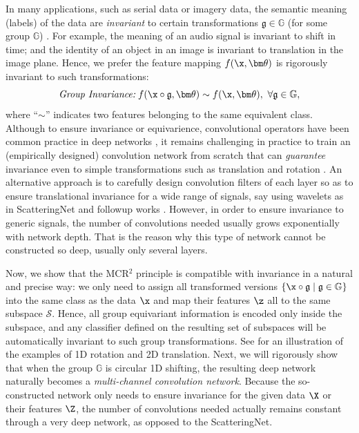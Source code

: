 \documentclass[../../book-main.tex]{subfiles}
\begin{document}
In many applications, such as serial data or imagery data, the
semantic meaning (labels) of the data are  {\em invariant} to certain
transformations $\mathfrak{g} \in \mathbb{G}$ (for some group
$\mathbb{G}$) \cite{CohenW16,deep-sets-NIPS2017}. For example, the
meaning of an audio signal is invariant to shift in time; and the
identity of an object in an image is invariant to translation in the
image plane. Hence, we prefer the feature mapping $f(\x,\bm \theta)$
is rigorously invariant to such transformations:
\begin{equation}
    \mbox{\em Group Invariance:}\;   f(\x\circ \mathfrak{g}, \bm
    \theta) \sim f(\x,\bm \theta),\ \forall \mathfrak{g} \in \mathbb{G},
\end{equation}
where ``$\sim$'' indicates two features belonging to the same
equivalent class. Although to ensure invariance or equivarience,
convolutional operators have been common practice in deep networks
\cite{CohenW16}, it remains challenging in practice to train an
(empirically designed) convolution network from scratch that can {\em
guarantee} invariance even to simple transformations such as
translation and rotation \cite{azulay2018deep,engstrom2017rotation}.
An alternative approach is to carefully design convolution filters of
each layer so as to ensure translational invariance for a wide range
of signals, say using wavelets as in ScatteringNet
\cite{scattering-net} and followup works \cite{Wiatowski-2018}.
However, in order to ensure invariance to generic signals, the number
of convolutions needed usually grows exponentially with network
depth. That is the reason why this type of network cannot be
constructed so deep, usually only several layers.

Now, we show that the MCR$^2$ principle is compatible with invariance
in a natural and precise way: we only need to assign all transformed
versions $\{\x\circ \mathfrak{g} \mid \mathfrak{g} \in \mathbb G\}$
into the same class as the data $\x$ and map their features $\z$ all
to the same subspace $\mathcal S$. Hence, all group equivariant
information is encoded only inside the subspace, and any classifier
defined on the resulting set of subspaces will be automatically
invariant to such group transformations. See
 for an illustration of the
examples of 1D rotation and 2D translation.  Next, we will rigorously
show that when the group $\mathbb G$ is circular 1D shifting, the
resulting deep network naturally becomes a {\em multi-channel
convolution network}.
Because the so-constructed network only needs to ensure invariance
for the given data $\X$ or their features $\Z$, the number of
convolutions needed actually remains constant through a very deep
network, as opposed to the ScatteringNet.
\end{document}
